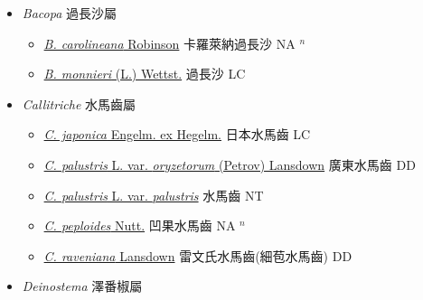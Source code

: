 
  \begin{itemize}
 \item[] \textit{Bacopa} 過長沙屬
                    
  \begin{itemize}
        \item[] \href{http://www.theplantlist.org/tpl1.1/search?q=Bacopa+carolineana}{\textit{B. carolineana} Robinson}   卡羅萊納過長沙 NA $^n$
        \item[] \href{http://www.theplantlist.org/tpl1.1/search?q=Bacopa+monnieri}{\textit{B. monnieri} (L.) Wettst.}   過長沙 LC
  \end{itemize}
 \item[] \textit{Callitriche} 水馬齒屬
                    
  \begin{itemize}
        \item[] \href{http://www.theplantlist.org/tpl1.1/search?q=Callitriche+japonica}{\textit{C. japonica} Engelm. ex Hegelm.}   日本水馬齒 LC
        \item[] \href{http://www.theplantlist.org/tpl1.1/search?q=Callitriche+palustris+var.+oryzetorum}{\textit{C. palustris} L. var. \textit{oryzetorum} (Petrov) Lansdown}   廣東水馬齒 DD
        \item[] \href{http://www.theplantlist.org/tpl1.1/search?q=Callitriche+palustris+var.+palustris}{\textit{C. palustris} L. var. \textit{palustris}}     水馬齒 NT
        \item[] \href{http://www.theplantlist.org/tpl1.1/search?q=Callitriche+peploides}{\textit{C. peploides} Nutt.}   凹果水馬齒 NA $^n$
        \item[] \href{http://www.theplantlist.org/tpl1.1/search?q=Callitriche+raveniana}{\textit{C. raveniana} Lansdown}   雷文氏水馬齒(細苞水馬齒) DD
  \end{itemize}
 \item[] \textit{Deinostema} 澤番椒屬
                    

\end{itemize}
